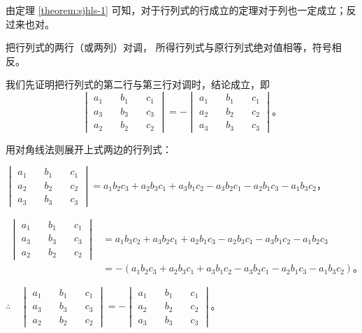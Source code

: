 由定理 \ref{theorem:sjhls-1} 可知，对于行列式的行成立的定理对于列也一定成立；反过来也对。


\begin{theorem} \label{theorem:sjhls-2}
    把行列式的两行（或两列）对调， 所得行列式与原行列式绝对值相等，符号相反。
\end{theorem}

\zhengming 我们先证明把行列式的第二行与第三行对调时，结论成立，即
$$
\begin{vmatrix*}
    a_1 \quad & b_1 \quad & c_1 \\
    a_3 \quad & b_3 \quad & c_3 \\
    a_2 \quad & b_2 \quad & c_2
\end{vmatrix*}
=
- \begin{vmatrix*}
    a_1 \quad & b_1 \quad & c_1 \\
    a_2 \quad & b_2 \quad & c_2 \\
    a_3 \quad & b_3 \quad & c_3
\end{vmatrix*} \text{。}
$$

用对角线法则展开上式两边的行列式：

$\begin{vmatrix*}
    a_1 \quad & b_1 \quad & c_1 \\
    a_2 \quad & b_2 \quad & c_2 \\
    a_3 \quad & b_3 \quad & c_3
\end{vmatrix*} = a_1b_2c_3 + a_2b_3c_1 + a_3b_1c_2 - a_3b_2c_1 - a_2b_1c_3 - a_1b_3c_2$，

$\begin{aligned}
\begin{vmatrix*}
    a_1 \quad & b_1 \quad & c_1 \\
    a_3 \quad & b_3 \quad & c_3 \\
    a_2 \quad & b_2 \quad & c_2
\end{vmatrix*}
    &= a_1b_3c_2 + a_3b_2c_1 + a_2b_1c_3 - a_2b_3c_1 - a_3b_1c_2 - a_1b_2c_3 \\
    &= -(a_1b_2c_3 + a_2b_3c_1 + a_3b_1c_2 - a_3b_2c_1 - a_2b_1c_3 - a_1b_3c_2) \text{。}
\end{aligned}$

$\therefore \quad
\begin{vmatrix*}
    a_1 \quad & b_1 \quad & c_1 \\
    a_3 \quad & b_3 \quad & c_3 \\
    a_2 \quad & b_2 \quad & c_2
\end{vmatrix*}
=
- \begin{vmatrix*}
    a_1 \quad & b_1 \quad & c_1 \\
    a_2 \quad & b_2 \quad & c_2 \\
    a_3 \quad & b_3 \quad & c_3
\end{vmatrix*} \text{。}
$

